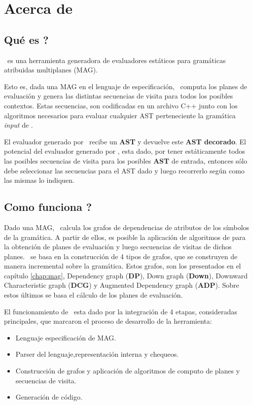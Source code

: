 \chapter{Acerca de \maggen}
\label{chap:acercamaggen}
\minitoc

\section{\textquestiondown Qué es \maggen?}
\maggen\ es una herramienta generadora de evaluadores estáticos para gramáticas atribuidas multiplanes (MAG). 

Esto es, dada una MAG en el lenguaje de especificación, \maggen\ computa los planes de evaluación y genera las distintas secuencias de visita para todos los posibles contextos. Estas secuencias, son codificadas en un archivo C++ junto con los algoritmos necesarios para evaluar cualquier AST perteneciente la gramática \textit{input} de \maggen.

El evaluador generado por \maggen\ recibe un \textbf{AST} y devuelve este \textbf{AST decorado}. El potencial del evaluador generado por \maggen, esta dado, por tener estáticamente todos las posibles secuencias de visita para los posibles \textbf{AST} de entrada, entonces sólo debe seleccionar las secuencias para el AST dado y luego recorrerlo según como las mismas lo indiquen.

\section{\textquestiondown Como funciona \maggen ?}
Dado una MAG, \maggen\ calcula los grafos de dependencias de atributos de los símbolos de la gramática. A partir de ellos, es posible la aplicación de algoritmos de para la obtención de planes de evaluación y luego secuencias de visitas de dichos planes. \maggen\ se basa en la construcción de 4 tipos de grafos, que se construyen de manera incremental sobre la gramática. Estos grafos, son los presentados en el capítulo \ref{chap:mag}, Dependency graph (\textbf{DP}), Down graph (\textbf{Down}), Downward Characteristic graph (\textbf{DCG}) y Augmented Dependency graph (\textbf{ADP}). Sobre estos últimos se basa el cálculo de los planes de evaluación.

El funcionamiento de \maggen\ esta dado por la integración de 4 etapas, consideradas principales, que marcaron el proceso de desarrollo de la herramienta:
\begin{itemize}
\item Lenguaje especificación de MAG.
\item Parser del lenguaje,representación interna y chequeos.
\item Construcción de grafos y aplicación de algoritmos de computo de planes y secuencias de visita.
\item Generación de código.
\end{itemize}


